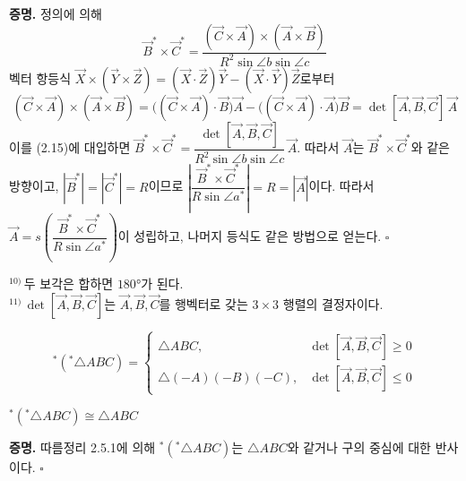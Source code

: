 \documentclass{article}
\begin{document}
\textbf{증명.}\quad
정의에 의해
\begin{equation}
  \vec{B}^*\times\vec{C}^*
  = \frac{(\vec{C}\times\vec{A})\times(\vec{A}\times\vec{B})}{R^2\sin\angle b\sin\angle c}
  \tag{2.15}
\end{equation}
벡터 항등식 $\vec{X}\times(\vec{Y}\times\vec{Z}) = (\vec{X}\cdot\vec{Z})\vec{Y} - (\vec{X}\cdot\vec{Y})\vec{Z}$로부터
\[
  (\vec{C}\times\vec{A})\times(\vec{A}\times\vec{B})
  = \bigl((\vec{C}\times\vec{A})\cdot\vec{B}\bigr)\vec{A}
   - \bigl((\vec{C}\times\vec{A})\cdot\vec{A}\bigr)\vec{B}
  = \det[\vec{A},\vec{B},\vec{C}]\,\vec{A}
\]
이를 (2.15)에 대입하면
$\vec{B}^*\times\vec{C}^* = \dfrac{\det[\vec{A},\vec{B},\vec{C}]}{R^2\sin\angle b\sin\angle c}\,\vec{A}$.
따라서 $\vec{A}$는 $\vec{B}^*\times\vec{C}^*$와 같은 방향이고,
$|\vec{B}^*|=|\vec{C}^*|=R$이므로
$\left|\dfrac{\vec{B}^*\times\vec{C}^*}{R\sin\angle a^*}\right| = R = |\vec{A}|$이다.
따라서 $\vec{A} = s\!\left(\dfrac{\vec{B}^*\times\vec{C}^*}{R\sin\angle a^*}\right)$이 성립하고,
나머지 등식도 같은 방법으로 얻는다. \hfill $\square$

\smallskip
\noindent$^{10)}$\,\small 두 보각은 합하면 $180°$가 된다.\normalsize\\
\noindent$^{11)}$\,\small $\det[\vec{A},\vec{B},\vec{C}]$는 $\vec{A},\vec{B},\vec{C}$를 행벡터로 갖는 $3\times 3$ 행렬의 결정자이다.\normalsize

\begin{tcolorbox}[
  colback=red!4, colframe=red!60!black,
  title=따름정리 2.5.1 (쌍대 삼각형의 쌍대),
  fonttitle=\bfseries, boxrule=0.5mm, arc=3mm]

\[
  {}^*({}^*\!\triangle ABC) =
  \begin{cases}
    \triangle ABC, & \det[\vec{A},\vec{B},\vec{C}] \ge 0 \\[4pt]
    \triangle(-A)(-B)(-C), & \det[\vec{A},\vec{B},\vec{C}] \le 0
  \end{cases}
\]

\end{tcolorbox}

\begin{tcolorbox}[
  colback=red!4, colframe=red!60!black,
  title=따름정리 2.5.2,
  fonttitle=\bfseries, boxrule=0.5mm, arc=3mm]

${}^*({}^*\!\triangle ABC) \cong \triangle ABC$

\end{tcolorbox}

\textbf{증명.}\quad
따름정리 2.5.1에 의해 ${}^*({}^*\!\triangle ABC)$는 $\triangle ABC$와 같거나
구의 중심에 대한 반사이다. \hfill $\square$
\end{document}
